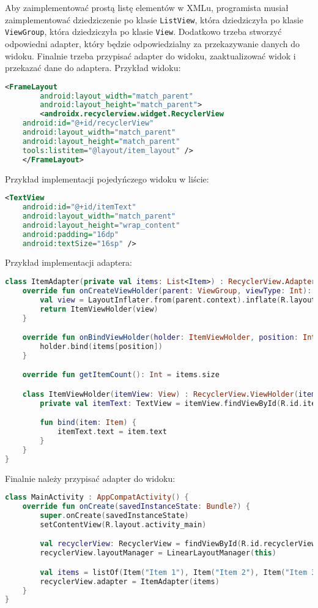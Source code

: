 Aby zaimplementować prostą listę elementów w XMLu, programista musiał zaimplementować dziedziczenie po klasie \texttt{ListView}, która dziedziczyła po klasie \texttt{ViewGroup}, która dziedziczyła po klasie \texttt{View}.
Dodatkowo trzeba stworzyć odpowiedni adapter, który będzie odpowiedzialny za przekazywanie danych do widoku.
Finalnie trzeba przypisać adapter do widoku, zaaktualizować widok i przekazać dane do adaptera.
Przykład widoku:
\begin{lstlisting}[language=xml]
    <FrameLayout
        android:layout_width="match_parent"
        android:layout_height="match_parent">
        <androidx.recyclerview.widget.RecyclerView
    android:id="@+id/recyclerView"
    android:layout_width="match_parent"
    android:layout_height="match_parent"
    tools:listitem="@layout/item_layout" />
    </FrameLayout>
\end{lstlisting}
Przykład implementacji pojedyńczego widoku w liście:
\begin{lstlisting}[language=xml]
<TextView
    android:id="@+id/itemText"
    android:layout_width="match_parent"
    android:layout_height="wrap_content"
    android:padding="16dp"
    android:textSize="16sp" />
\end{lstlisting}
Przykład implementacji adaptera:
\begin{lstlisting}[language=Kotlin]
class ItemAdapter(private val items: List<Item>) : RecyclerView.Adapter<ItemAdapter.ItemViewHolder>() {
    override fun onCreateViewHolder(parent: ViewGroup, viewType: Int): ItemViewHolder {
        val view = LayoutInflater.from(parent.context).inflate(R.layout.item_layout, parent, false)
        return ItemViewHolder(view)
    }

    override fun onBindViewHolder(holder: ItemViewHolder, position: Int) {
        holder.bind(items[position])
    }

    override fun getItemCount(): Int = items.size

    class ItemViewHolder(itemView: View) : RecyclerView.ViewHolder(itemView) {
        private val itemText: TextView = itemView.findViewById(R.id.itemText)

        fun bind(item: Item) {
            itemText.text = item.text
        }
    }
}
\end{lstlisting}
Finalnie należy przypisać adapter do widoku:
\begin{lstlisting}[language=Kotlin]
class MainActivity : AppCompatActivity() {
    override fun onCreate(savedInstanceState: Bundle?) {
        super.onCreate(savedInstanceState)
        setContentView(R.layout.activity_main)

        val recyclerView: RecyclerView = findViewById(R.id.recyclerView)
        recyclerView.layoutManager = LinearLayoutManager(this)

        val items = listOf(Item("Item 1"), Item("Item 2"), Item("Item 3"))
        recyclerView.adapter = ItemAdapter(items)
    }
}
\end{lstlisting}
